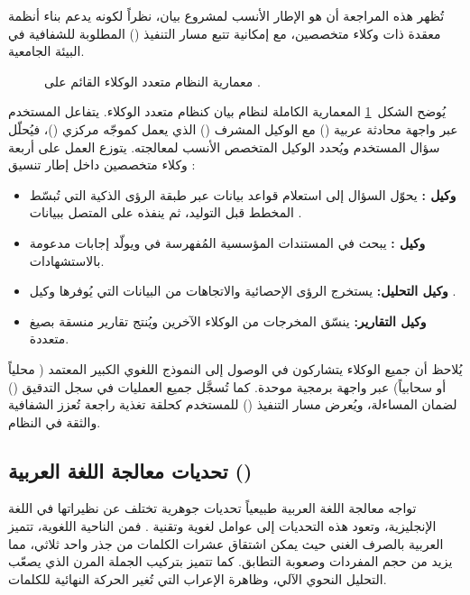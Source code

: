 تُظهر هذه المراجعة أن  هو الإطار الأنسب لمشروع بيان، نظراً
لكونه يدعم بناء أنظمة معقدة ذات وكلاء متخصصين، مع إمكانية تتبع مسار التنفيذ
() المطلوبة للشفافية في البيئة الجامعية.

\begin{figure}[!htbp]
  \centering
  \resizebox{0.95\textwidth}{!}{}
  \caption{معمارية النظام متعدد الوكلاء القائم على .}
  \label{fig:multi-agent}
\end{figure}

\noindent يُوضح الشكل~\ref{fig:multi-agent} المعمارية الكاملة لنظام بيان
كنظام متعدد الوكلاء. يتفاعل المستخدم عبر واجهة محادثة عربية ()
مع الوكيل المشرف () الذي يعمل كموجّه مركزي
()، فيُحلّل سؤال المستخدم ويُحدد الوكيل المتخصص الأنسب
لمعالجته. يتوزع العمل على أربعة وكلاء متخصصين داخل إطار تنسيق
:

\begin{itemize}[label=\textcolor{kauprimary}{$\blacktriangleright$},leftmargin=*]
  \item \textbf{وكيل :} يحوّل السؤال إلى استعلام قواعد بيانات عبر
        طبقة الرؤى الذكية التي تُبسّط المخطط قبل التوليد، ثم ينفذه على
         المتصل ببيانات .
  \item \textbf{وكيل :} يبحث في المستندات المؤسسية المُفهرسة في
         ويولّد إجابات مدعومة بالاستشهادات.
  \item \textbf{وكيل التحليل:} يستخرج الرؤى الإحصائية والاتجاهات من
        البيانات التي يُوفرها وكيل .
  \item \textbf{وكيل التقارير:} ينسّق المخرجات من الوكلاء الآخرين ويُنتج
        تقارير منسقة بصيغ متعددة.
\end{itemize}

يُلاحظ أن جميع الوكلاء يتشاركون في الوصول إلى النموذج اللغوي الكبير المعتمد
( محلياً أو  سحابياً) عبر واجهة برمجية موحدة. كما تُسجَّل جميع
العمليات في سجل التدقيق () لضمان المساءلة، ويُعرض مسار
التنفيذ () للمستخدم كحلقة تغذية راجعة تُعزز الشفافية
والثقة في النظام.

\subsection{تحديات معالجة اللغة العربية ()}
\label{subsec:arabic-nlp}

تواجه معالجة اللغة العربية طبيعياً تحديات جوهرية تختلف عن نظيراتها في اللغة
الإنجليزية، وتعود هذه التحديات إلى عوامل لغوية وتقنية \cite{guellil2021arabic}.
فمن الناحية اللغوية، تتميز العربية بالصرف الغني حيث يمكن اشتقاق عشرات الكلمات
من جذر واحد ثلاثي، مما يزيد من حجم المفردات وصعوبة التطابق. كما تتميز بتركيب
الجملة المرن الذي يصعّب التحليل النحوي الآلي، وظاهرة الإعراب التي تُغير الحركة
النهائية للكلمات.

